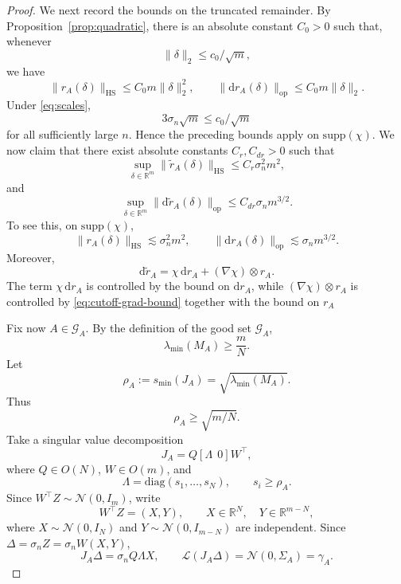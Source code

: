 \documentclass[11pt, reqno]{amsart}
\numberwithin{equation}{section}
\theoremstyle{remark}
\newcommand{\R}{\mathbb{R}}
\newcommand{\1}{\mathbf{1}}
\newcommand{\HS}{\mathrm{HS}}
\newcommand{\op}{\mathrm{op}}
\newcommand{\Law}{\mathcal{L}}
\newcommand{\diag}{\mathrm{diag}}
\newcommand{\dd}{\mathrm{d}}
\begin{document}
\begin{proof}
We next record the bounds on the truncated remainder. By
Proposition~\ref{prop:quadratic}, there is an absolute constant
$C_{0}>0$ such that, whenever
\[
\|\delta\|_2\le c_0/\sqrt m,
\]
we have
\[
\|r_A(\delta)\|_{\HS}\le C_{0}m\|\delta\|_2^2,
\qquad
\|\dd r_A(\delta)\|_{\op}\le C_{0}m\|\delta\|_2.
\]
Under \eqref{eq:scales},
\[
3\sigma_n\sqrt m\le c_0/\sqrt m
\]
for all sufficiently large $n$. Hence the preceding bounds apply on
$\mathrm{supp}(\chi)$. We now claim that there exist absolute constants
$C_r,C_{dr}>0$ such that
\begin{equation}
\label{eq:trunc-r-clean}
\sup_{\delta\in\R^m}\|\widetilde r_A(\delta)\|_{\HS}
\le
C_r\sigma_n^2m^2,
\end{equation}
and
\begin{equation}
\label{eq:trunc-dr-clean}
\sup_{\delta\in\R^m}\|\dd\widetilde r_A(\delta)\|_{\op}
\le
C_{dr}\sigma_n m^{3/2}.
\end{equation}
To see this, on $\mathrm{supp}(\chi)$,
\[
\|r_A(\delta)\|_{\HS}\lesssim \sigma_n^2m^2,
\qquad
\|\dd r_A(\delta)\|_{\op}\lesssim \sigma_n m^{3/2}.
\]
Moreover,
\[
\dd\widetilde r_A
=
\chi\,\dd r_A+(\nabla\chi)\otimes r_A.
\]
The term $\chi\,\dd r_A$ is controlled by the bound on $\dd r_A$, while $(\nabla\chi)\otimes r_A$ is controlled by \eqref{eq:cutoff-grad-bound} together with the bound on $r_A$

Fix now $A\in\mathcal G_A$. By the definition of the good set $\mathcal G_A$,
\[
\lambda_{\min}(M_A)\ge \frac{m}{N}.
\]
Let
\[
\rho_A:=s_{\min}(J_A)=\sqrt{\lambda_{\min}(M_A)}.
\]
Thus
\begin{equation}
\label{eq:rho-lower-clean}
\rho_A\ge \sqrt{m/N}.
\end{equation}
Take a singular value decomposition
\[
J_A=Q[\Lambda\ \ 0]W^\top,
\]
where $Q\in O(N)$, $W\in O(m)$, and
\[
\Lambda=\diag(s_1,\dots,s_N),
\qquad
s_i\ge \rho_A.
\]
Since $W^\top Z\sim\mathcal N(0,I_m)$, write
\[
W^\top Z=(X,Y),
\qquad
X\in\R^N,\quad Y\in\R^{m-N},
\]
where $X\sim\mathcal N(0,I_N)$ and $Y\sim\mathcal N(0,I_{m-N})$ are independent.
Since $\Delta=\sigma_n Z=\sigma_n W(X,Y)$,
\begin{equation}
\label{eq:linear-gaussian-law-clean}
J_A\Delta=\sigma_n Q\Lambda X,
\qquad
\Law(J_A\Delta)=\mathcal N(0,\Sigma_A)=\gamma_A.
\end{equation}


\end{proof}
\end{document}

